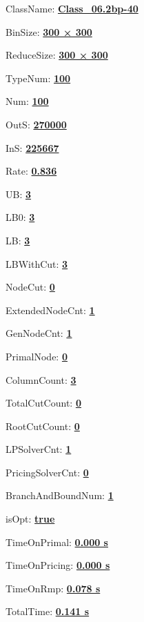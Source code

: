\documentclass[11pt]{article}
\begin{document}
\pagestyle{empty}


ClassName: \underline{\textbf{Class_06.2bp-40}}
\par
BinSize: \underline{\textbf{300 × 300}}
\par
ReduceSize: \underline{\textbf{300 × 300}}
\par
TypeNum: \underline{\textbf{100}}
\par
Num: \underline{\textbf{100}}
\par
OutS: \underline{\textbf{270000}}
\par
InS: \underline{\textbf{225667}}
\par
Rate: \underline{\textbf{0.836}}
\par
UB: \underline{\textbf{3}}
\par
LB0: \underline{\textbf{3}}
\par
LB: \underline{\textbf{3}}
\par
LBWithCut: \underline{\textbf{3}}
\par
NodeCut: \underline{\textbf{0}}
\par
ExtendedNodeCnt: \underline{\textbf{1}}
\par
GenNodeCnt: \underline{\textbf{1}}
\par
PrimalNode: \underline{\textbf{0}}
\par
ColumnCount: \underline{\textbf{3}}
\par
TotalCutCount: \underline{\textbf{0}}
\par
RootCutCount: \underline{\textbf{0}}
\par
LPSolverCnt: \underline{\textbf{1}}
\par
PricingSolverCnt: \underline{\textbf{0}}
\par
BranchAndBoundNum: \underline{\textbf{1}}
\par
isOpt: \underline{\textbf{true}}
\par
TimeOnPrimal: \underline{\textbf{0.000 s}}
\par
TimeOnPricing: \underline{\textbf{0.000 s}}
\par
TimeOnRmp: \underline{\textbf{0.078 s}}
\par
TotalTime: \underline{\textbf{0.141 s}}
\par
\newpage
\end{document}
